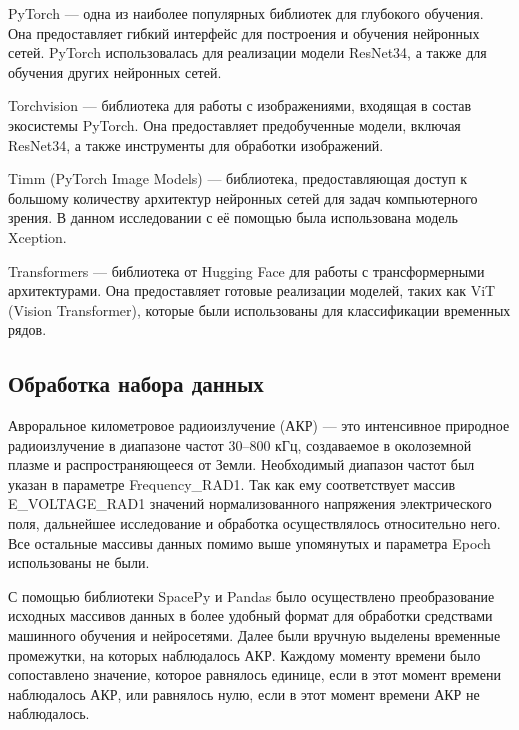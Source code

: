 \documentclass[spec, och, diploma]{SCWorks}
\begin{document}
        PyTorch — одна из наиболее популярных библиотек для глубокого обучения.
        Она предоставляет гибкий интерфейс для построения и обучения нейронных
        сетей. PyTorch использовалась для реализации модели ResNet34, а также
        для обучения других нейронных сетей. \cite{fwpytorch}

        Torchvision — библиотека для работы с изображениями, входящая в состав
        экосистемы PyTorch. Она предоставляет предобученные модели, включая
        ResNet34, а также инструменты для обработки изображений.
        \cite{fwtorchvision}

        Timm (PyTorch Image Models) — библиотека, предоставляющая доступ к
        большому количеству архитектур нейронных сетей для задач компьютерного
        зрения. В данном исследовании с её помощью была использована модель
        Xception. \cite{fwtimm}

        Transformers — библиотека от Hugging Face для работы с трансформерными
        архитектурами. Она предоставляет готовые реализации моделей, таких как
        ViT (Vision Transformer), которые были использованы для классификации
        временных рядов. \cite{fwtransformers}

    \subsection{Обработка набора данных}

        Авроральное километровое радиоизлучение (АКР) — это интенсивное
        природное радиоизлучение в диапазоне частот 30–800 кГц, создаваемое в
        околоземной плазме и распространяющееся от Земли. Необходимый диапазон
        частот был указан в параметре Frequency_RAD1. Так как ему соответствует
        массив E_VOLTAGE_RAD1 значений нормализованного напряжения
        электрического поля, дальнейшее исследование и обработка осуществлялось
        относительно него. Все остальные массивы данных помимо выше упомянутых и
        параметра Epoch использованы не были.
        
        С помощью библиотеки SpacePy и Pandas было осуществлено преобразование
        исходных массивов данных в более удобный формат для обработки средствами
        машинного обучения и нейросетями. Далее были вручную выделены временные
        промежутки, на которых наблюдалось АКР. Каждому моменту времени было
        сопоставлено значение, которое равнялось единице, если в этот момент
        времени наблюдалось АКР, или равнялось нулю, если в этот момент времени
        АКР не наблюдалось.
\end{document}
